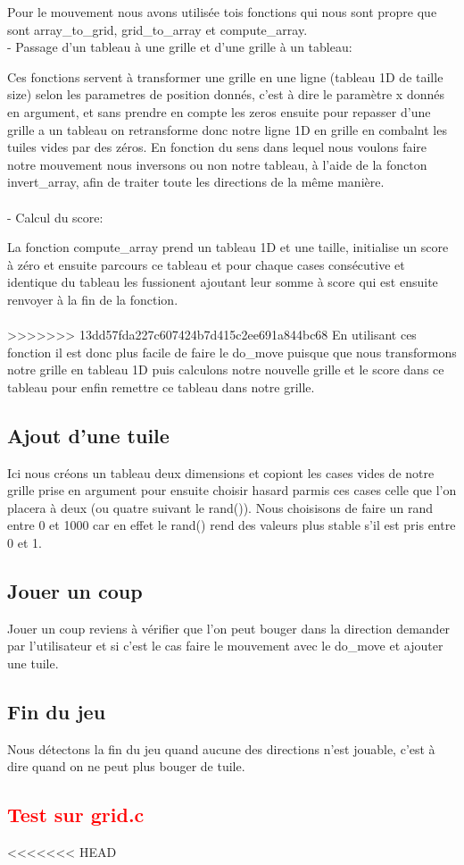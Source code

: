 \documentclass{article}
\begin{document}
Pour le mouvement nous avons utilisée tois fonctions qui nous sont propre que sont array\_to\_grid, grid\_to\_array et compute\_array.\\

- Passage d'un tableau à une grille et d'une grille à un tableau:\par
Ces fonctions servent à transformer une grille en une ligne (tableau 1D de taille size) selon les parametres de position donnés, c'est à dire le paramètre x donnés en argument, et sans prendre en compte les zeros ensuite pour repasser d'une grille a un tableau on retransforme donc notre ligne 1D en grille en combalnt les tuiles vides par des zéros. En fonction du sens dans lequel nous voulons faire notre mouvement nous inversons ou non notre tableau, à l'aide de la foncton invert\_array, afin de traiter toute les directions de la même manière.
\\
\\
- Calcul du score:\par
La fonction compute\_array prend un tableau 1D et une taille, initialise un score à zéro et ensuite parcours ce tableau et pour chaque cases consécutive et identique du tableau les fussionent ajoutant leur somme à score qui est ensuite renvoyer à la fin de la fonction.
\\ \\
>>>>>>> 13dd57fda227c607424b7d415c2ee691a844bc68
En utilisant ces fonction il est donc plus facile de faire le do\_move puisque que nous transformons notre grille en tableau 1D puis calculons notre nouvelle grille et le score dans ce tableau pour enfin remettre ce tableau dans notre grille.
\subsection{Ajout d'une tuile}
Ici nous créons un tableau deux dimensions et copiont les cases vides de notre grille prise en argument pour ensuite choisir hasard parmis ces cases celle que l'on placera à deux (ou quatre suivant le rand()). Nous choisisons de faire un rand entre 0 et 1000 car en effet le rand() rend des valeurs plus stable s'il est pris entre 0 et 1.
\subsection{Jouer un coup}
Jouer un coup reviens à vérifier que l'on peut bouger dans la direction demander par l'utilisateur et si c'est le cas faire le mouvement avec le do\_move et ajouter une tuile.
\subsection{Fin du jeu}
Nous détectons la fin du jeu quand aucune des directions n'est jouable, c'est à dire quand on ne peut plus bouger de tuile.
\textcolor{red}{\section{Test sur grid.c}}
<<<<<<< HEAD
\end{document}
